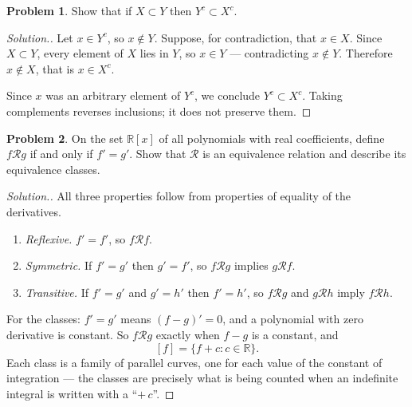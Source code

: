 \documentclass[11pt,a4paper]{article}
\theoremstyle{definition}
\newtheorem{problemx}{Problem}[section]
\newenvironment{problem}{\begin{problemx}}{\end{problemx}}
\newenvironment{solution}
  {\renewcommand{\qedsymbol}{}\begin{proof}[\textit{Solution}.]}
  {\end{proof}}
\begin{document}
\begin{problem}
Show that if $X\subset Y$ then $Y^c\subset X^c$.
\end{problem}
\begin{solution}
Let $x\in Y^c$, so $x\notin Y$. Suppose, for contradiction, that $x\in X$.
Since $X\subset Y$, every element of $X$ lies in $Y$, so $x\in Y$ ---
contradicting $x\notin Y$. Therefore $x\notin X$, that is $x\in X^c$.

Since $x$ was an arbitrary element of $Y^c$, we conclude $Y^c\subset X^c$.
Taking complements reverses inclusions; it does not preserve them.
\end{solution}

\begin{problem}
On the set $\mathbb{R}[x]$ of all polynomials with real coefficients, define
$f\mathcal{R}g$ if and only if $f'=g'$. Show that $\mathcal{R}$ is an
equivalence relation and describe its equivalence classes.
\end{problem}
\begin{solution}
All three properties follow from properties of equality of the derivatives.
\begin{enumerate}
\item[i.] \emph{Reflexive.} $f'=f'$, so $f\mathcal{R}f$.
\item[ii.] \emph{Symmetric.} If $f'=g'$ then $g'=f'$, so $f\mathcal{R}g$
implies $g\mathcal{R}f$.
\item[iii.] \emph{Transitive.} If $f'=g'$ and $g'=h'$ then $f'=h'$, so
$f\mathcal{R}g$ and $g\mathcal{R}h$ imply $f\mathcal{R}h$.
\end{enumerate}
For the classes: $f'=g'$ means $(f-g)'=0$, and a polynomial with zero
derivative is constant. So $f\mathcal{R}g$ exactly when $f-g$ is a constant,
and
$$[f]=\{f+c: c\in\mathbb{R}\}.$$
Each class is a family of parallel curves, one for each value of the constant
of integration --- the classes are precisely what is being counted when an
indefinite integral is written with a ``$+\,c$''.
\end{solution}
\end{document}

